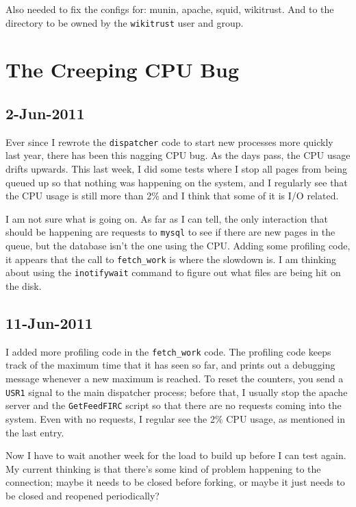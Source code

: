 Also needed to fix the configs for: munin, apache, squid, wikitrust.
And to  the directory to be owned by the \texttt{wikitrust}
user and group. 

\section{The Creeping CPU Bug}

\subsection{2-Jun-2011}

Ever since I rewrote the \texttt{dispatcher} code to start
new processes more quickly last year, there has been this
nagging CPU bug.
As the days pass, the CPU usage drifts upwards.
This last week, I did some tests where I stop all pages from being
queued up so that nothing was happening on the system, and I
regularly see that the CPU usage is still more than 2\%
and I think that some of it is I/O related.

I am not sure what is going on.
As far as I can tell, the only interaction that should be happening
are requests to \texttt{mysql} to see if there are new pages in the
queue, but the database isn't the one using the CPU.
Adding some profiling code, it appears that the call to
\texttt{fetch\_work} is where the slowdown is.
I am thinking about using the \texttt{inotifywait} command
to figure out what files are being hit on the disk.

\subsection{11-Jun-2011}

I added more profiling code in the \texttt{fetch\_work} code.
The profiling code keeps track of the maximum time that it has
seen so far, and prints out a debugging message whenever a
new maximum is reached.
To reset the counters, you send a \texttt{USR1} signal to the
main dispatcher process; before that, I usually stop the apache
server and the \texttt{GetFeedFIRC} script so that there are
no requests coming into the system.
Even with no requests, I regular see the 2\% CPU usage,
as mentioned in the last entry.

Now I have to wait another week for the load to build up
before I can test again.
My current thinking is that there's some kind of
problem happening to the \mysql connection; maybe
it needs to be closed before forking, or maybe it just
needs to be closed and reopened periodically?

